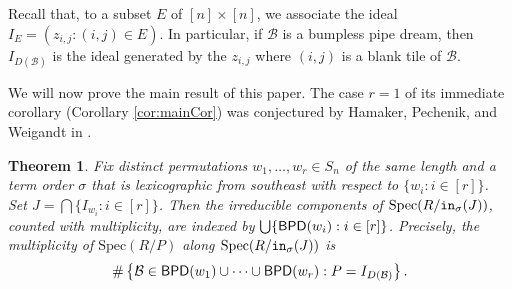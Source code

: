 \documentclass[12pt,reqno]{amsart}
\newtheorem{theorem}{Theorem}[section]
\newtheorem{Main Conjecture}[theorem]{Main Conjecture}
\theoremstyle{remark}
\theoremstyle{plain}
\newcommand{\init}{{\tt in}}
\newcommand{\bpd}{{\sf BPD}}
\newcommand{\spec}{{\mbox{Spec}}}
\begin{document}
 Recall that, to a subset $E$ of $[n] \times [n]$, we associate the ideal $I_E = (z_{i,j} : (i,j) \in E)$.  In particular, if $\mathcal{B}$ is a bumpless pipe dream, then $I_{D(\mathcal{B})}$ is the ideal generated by the $z_{i,j}$ where $(i,j)$ is a blank tile of $\mathcal{B}$.

We will now prove the main result of this paper. The case $r=1$ of its immediate corollary (Corollary \ref{cor:mainCor}) was conjectured by Hamaker, Pechenik, and Weigandt in \cite[Conjecture 1.2]{HPW}.  


\begin{theorem}
\label{thm:main}
Fix distinct permutations $w_1, \ldots, w_r \in S_n$ of the same length and a term order $\sigma$ that is lexicographic from southeast with respect to $\{w_i:i\in[r]\}$. Set $J = \bigcap \{I_{w_i}:i\in[r]\}$.  Then the irreducible components of $\spec(R/\init_\sigma(J))$, counted with multiplicity, are indexed by 
$ \bigcup\{\bpd(w_i):i\in[r]\}$.  
Precisely, the multiplicity of $\spec(R/P)$ along $\spec(R/\init_\sigma(J))$ is \[
\#\left\{\mathcal{B} \in \bpd(w_1)\cup \cdots \cup \bpd(w_r) : P = I_{D(\mathcal{B})} \right\}.
\]
\end{theorem}
\end{document}
